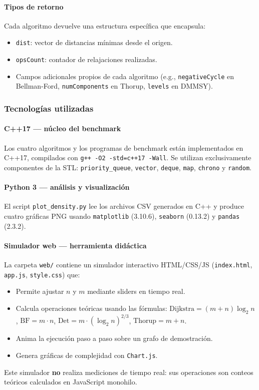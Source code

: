 \paragraph{Tipos de retorno}
Cada algoritmo devuelve una estructura específica que encapsula:
\begin{itemize}
  \item \texttt{dist}: vector de distancias mínimas desde el origen.
  \item \texttt{opsCount}: contador de relajaciones realizadas.
  \item Campos adicionales propios de cada algoritmo (e.g., \texttt{negativeCycle}
    en Bellman-Ford, \texttt{numComponents} en Thorup, \texttt{levels} en DMMSY).
\end{itemize}

\subsubsection{Tecnologías utilizadas}

\paragraph{C++17 — núcleo del benchmark}
Los cuatro algoritmos y los programas de benchmark están implementados en C++17,
compilados con \texttt{g++ -O2 -std=c++17 -Wall}.
Se utilizan exclusivamente componentes de la STL:
\texttt{priority\_queue}, \texttt{vector}, \texttt{deque}, \texttt{map},
\texttt{chrono} y \texttt{random}.

\paragraph{Python 3 — análisis y visualización}
El script \texttt{plot\_density.py} lee los archivos CSV generados en C++ y
produce cuatro gráficas PNG usando \texttt{matplotlib} (3.10.6),
\texttt{seaborn} (0.13.2) y \texttt{pandas} (2.3.2).

\paragraph{Simulador web — herramienta didáctica}
La carpeta \texttt{web/} contiene un simulador interactivo HTML/CSS/JS
(\texttt{index.html}, \texttt{app.js}, \texttt{style.css}) que:
\begin{itemize}
  \item Permite ajustar $n$ y $m$ mediante sliders en tiempo real.
  \item Calcula operaciones teóricas usando las fórmulas:
    $\text{Dijkstra} = (m+n)\log_2 n$,\;
    $\text{BF} = m \cdot n$,\;
    $\text{Det} = m\cdot(\log_2 n)^{2/3}$,\;
    $\text{Thorup} = m+n$.
  \item Anima la ejecución paso a paso sobre un grafo de demostración.
  \item Genera gráficas de complejidad con \texttt{Chart.js}.
\end{itemize}
Este simulador \textbf{no} realiza mediciones de tiempo real: sus operaciones
son conteos teóricos calculados en JavaScript monohilo.


